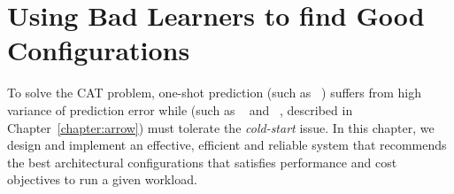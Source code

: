 \chapter{Using Bad Learners to find Good Configurations}
\label{chapter:rank}

To solve the CAT problem,
one-shot prediction (such as \paris~\cite{Yadwadkar2017}) suffers from
high variance of prediction error
while \bo (such as \cherrypick~\cite{Alipourfard2017} and \arrow~\cite{Hsu2018Arrow},
described in Chapter~\ref{chapter:arrow}) must
tolerate the \emph{cold-start} issue.
In this chapter, we design and implement an
effective, efficient and reliable system that recommends
the best architectural configurations 
that satisfies performance and cost objectives
to run a given workload.



%






